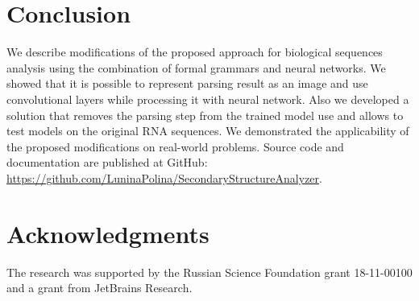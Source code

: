 \documentclass[12pt,a4paper]{cibb}
\begin{document}
\section{\bf Conclusion}

We describe modifications of the proposed approach for biological sequences analysis using the combination of formal grammars and neural networks.
We showed that it is possible to represent parsing result as an image and use convolutional layers while processing it with neural network.
Also we developed a solution that removes the parsing step from the trained model use and allows to test models on the original RNA sequences.
We demonstrated the applicability of the proposed modifications on real-world problems.
Source code and documentation are published at GitHub: \url{https://github.com/LuninaPolina/SecondaryStructureAnalyzer}.

\section*{\bf Acknowledgments}

The research was supported by the Russian Science Foundation grant 18-11-00100 and a grant from JetBrains Research.



%


{\fontsize{10}{10}\selectfont
\setlength{\parskip}{0pt}



}
\end{document}
